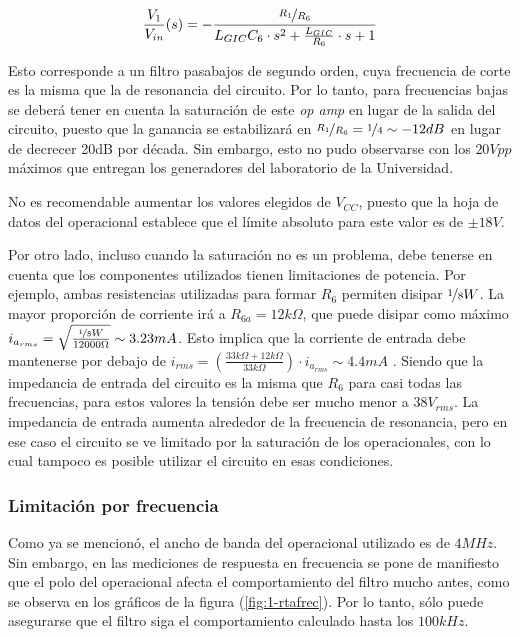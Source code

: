 \documentclass[../../tc_tp3_main.tex]{subfiles}
\begin{document}
\begin{equation}
	\frac{V_1}{V_{in}} (s)=  - \frac{\nicefrac{R_1}{R_6}}{ L_{GIC}C_6 \cdot s^2  + \frac{L_{GIC}}{R_6} \cdot s + 1}
\end{equation}

Esto corresponde a un filtro pasabajos de segundo orden, cuya frecuencia de corte es la misma que la de resonancia del circuito. Por lo tanto, para frecuencias bajas se deber\'a tener en cuenta la saturaci\'on de este \textit{op amp} en lugar de la salida del circuito, puesto que la ganancia se estabilizar\'a en $\nicefrac{R_1}{R_6} = \nicefrac{1}{4}\sim -12dB$ en lugar de decrecer 20dB por d\'ecada. Sin embargo, esto no pudo observarse con los $20V{pp}$ m\'aximos que entregan los generadores del laboratorio de la Universidad. \par

No es recomendable aumentar los valores elegidos de $V_{CC}$, puesto que la hoja de datos del operacional establece que el l\'imite absoluto para este valor es de $\pm 18V$.\par

Por otro lado, incluso cuando la saturaci\'on no es un problema, debe tenerse en cuenta que los componentes utilizados tienen limitaciones de potencia. Por ejemplo, ambas resistencias utilizadas para formar $R_6$ permiten disipar $\nicefrac{1}{8}W$. La mayor proporci\'on de corriente ir\'a a $R_{6a} = 12k\Omega$, que puede disipar como m\'aximo $i_{a_{rms}} = \sqrt{\frac{\nicefrac{1}{8} W}{12000\Omega}} \sim 3.23mA$. Esto implica que la corriente de entrada debe mantenerse por debajo de $i_{rms} = \left(\frac{33k\Omega+12k\Omega}{33k\Omega}\right) \cdot i_{a_{rms}} \sim 4.4mA$ . Siendo que la impedancia de entrada del circuito es la misma que $R_6$ para casi todas las frecuencias, para estos valores la tensi\'on debe ser mucho menor a $38V_{rms}$. La impedancia de entrada aumenta alrededor de la frecuencia de resonancia, pero en ese caso el circuito se ve limitado por la saturaci\'on de los operacionales, con lo cual tampoco es posible utilizar el circuito en esas condiciones. \par



\subsubsection{Limitaci\'on por frecuencia}
Como ya se mencion\'o, el ancho de banda del operacional utilizado es de $4MHz$. Sin embargo, en las mediciones de respuesta en frecuencia se pone de manifiesto que el polo del operacional afecta el comportamiento del filtro mucho antes, como se observa en los gr\'aficos de la figura (\ref{fig:1-rtafrec}). Por lo tanto, s\'olo puede asegurarse que el filtro siga el comportamiento calculado hasta los $100kHz$.
\end{document}

